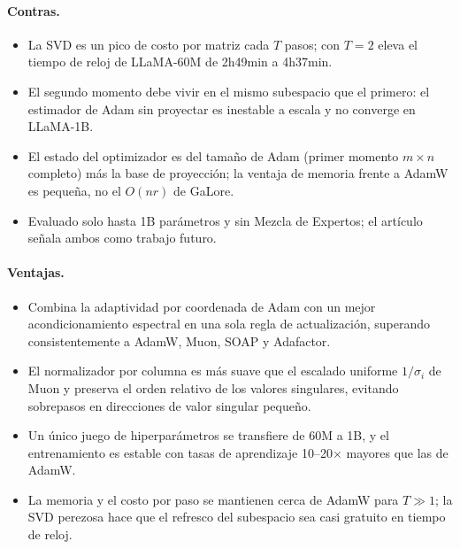 \paragraph{Contras.}
\begin{itemize}[leftmargin=*]
\item La SVD es un pico de costo por matriz cada $T$ pasos; con $T=2$ eleva el tiempo de
  reloj de LLaMA-60M de 2h49min a 4h37min.
\item El segundo momento debe vivir en el mismo subespacio que el primero: el estimador
  de Adam sin proyectar es inestable a escala y no converge en LLaMA-1B.
\item El estado del optimizador es del tamaño de Adam (primer momento $m\times n$
  completo) más la base de proyección; la ventaja de memoria frente a AdamW es pequeña,
  no el $O(nr)$ de GaLore.
\item Evaluado solo hasta 1B parámetros y sin Mezcla de Expertos; el artículo señala
  ambos como trabajo futuro.
\end{itemize}

\paragraph{Ventajas.}
\begin{itemize}[leftmargin=*]
\item Combina la adaptividad por coordenada de Adam con un mejor acondicionamiento
  espectral en una sola regla de actualización, superando consistentemente a AdamW,
  Muon, SOAP y Adafactor.
\item El normalizador por columna es más suave que el escalado uniforme $1/\sigma_i$ de
  Muon y preserva el orden relativo de los valores singulares, evitando sobrepasos en
  direcciones de valor singular pequeño.
\item Un único juego de hiperparámetros se transfiere de 60M a 1B, y el entrenamiento es
  estable con tasas de aprendizaje 10--20$\times$ mayores que las de AdamW.
\item La memoria y el costo por paso se mantienen cerca de AdamW para $T \gg 1$; la SVD
  perezosa hace que el refresco del subespacio sea casi gratuito en tiempo de reloj.
\end{itemize}

